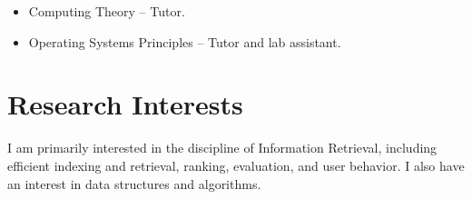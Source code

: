 \documentclass[line]{res}
\begin{document}
\begin{resume}
\begin{itemize}[topsep=3pt]
                        \item Computing Theory -- Tutor. \hfill {}
                        \item Operating Systems Principles -- Tutor and lab assistant. \hfill {}
                     \end{itemize}
\section{Research Interests}{
I am primarily interested in the discipline of Information Retrieval, including efficient indexing
and retrieval, ranking, evaluation, and user behavior. I also have an interest in data structures and
algorithms.
}
 

\end{resume}
\end{document}
